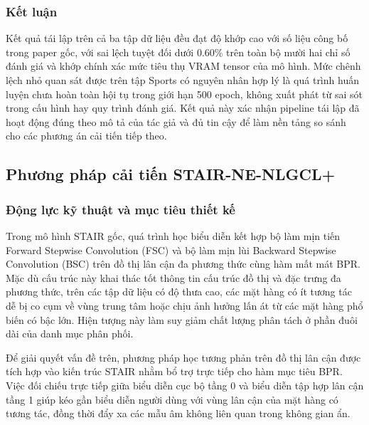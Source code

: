 \subsubsection{Kết luận}

Kết quả tái lập trên cả ba tập dữ liệu đều đạt độ khớp cao với số liệu công bố trong paper gốc, với sai lệch tuyệt đối dưới 0.60\% trên toàn bộ mười hai chỉ số đánh giá và khớp chính xác mức tiêu thụ VRAM tensor của mô hình. Mức chênh lệch nhỏ quan sát được trên tập Sports có nguyên nhân hợp lý là quá trình huấn luyện chưa hoàn toàn hội tụ trong giới hạn 500 epoch, không xuất phát từ sai sót trong cấu hình hay quy trình đánh giá. Kết quả này xác nhận pipeline tái lập đã hoạt động đúng theo mô tả của tác giả và đủ tin cậy để làm nền tảng so sánh cho các phương án cải tiến tiếp theo.

\subsection{Phương pháp cải tiến STAIR-NE-NLGCL+}
\label{sec:stair_ne_nlgcl_plus}

\subsubsection{Động lực kỹ thuật và mục tiêu thiết kế}

Trong mô hình STAIR gốc, quá trình học biểu diễn kết hợp bộ làm mịn tiến Forward Stepwise Convolution (FSC) và bộ làm mịn lùi Backward Stepwise Convolution (BSC) trên đồ thị lân cận đa phương thức cùng hàm mất mát BPR. Mặc dù cấu trúc này khai thác tốt thông tin cấu trúc đồ thị và đặc trưng đa phương thức, trên các tập dữ liệu có độ thưa cao, các mặt hàng có ít tương tác dễ bị co cụm về vùng trung tâm hoặc chịu ảnh hưởng lấn át từ các mặt hàng phổ biến có bậc lớn. Hiện tượng này làm suy giảm chất lượng phân tách ở phần đuôi dài của danh mục phân phối.

Để giải quyết vấn đề trên, phương pháp học tương phản trên đồ thị lân cận được tích hợp vào kiến trúc STAIR nhằm bổ trợ trực tiếp cho hàm mục tiêu BPR. Việc đối chiếu trực tiếp giữa biểu diễn cục bộ tầng 0 và biểu diễn tập hợp lân cận tầng 1 giúp kéo gần biểu diễn người dùng với vùng lân cận của mặt hàng có tương tác, đồng thời đẩy xa các mẫu âm không liên quan trong không gian ẩn. 

